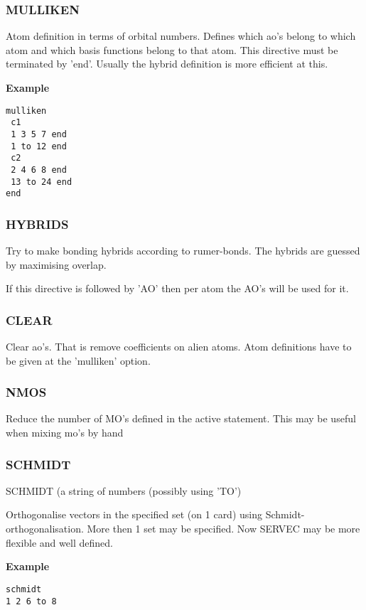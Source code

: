 \documentclass[11pt,fleqn]{article}
\begin{document}
\subsubsection{MULLIKEN}

Atom definition in terms of orbital numbers. Defines which ao's belong
to which atom and which basis functions belong to that atom. This directive must
be terminated by 'end'.  Usually the hybrid definition is more efficient at this.

{\bf Example}
\begin{verbatim}
mulliken
 c1
 1 3 5 7 end
 1 to 12 end
 c2
 2 4 6 8 end
 13 to 24 end
end
\end{verbatim}

\subsubsection{HYBRIDS}

Try to make bonding hybrids according to rumer-bonds. The hybrids are
guessed by maximising overlap.

If this directive is followed by 'AO' then per atom the AO's will be
used for it. 

\subsubsection{CLEAR}

Clear ao's. That is remove coefficients on alien atoms. Atom definitions
have to be given at the 'mulliken' option. 

\subsubsection{NMOS}

Reduce the number of MO's defined in the active statement. 
This may be useful when mixing mo's by hand

\subsubsection{SCHMIDT}

SCHMIDT (a string of numbers (possibly using 'TO')

Orthogonalise vectors in the specified set (on 1 card) using Schmidt-orthogonalisation. 
More then 1 set may be specified. Now SERVEC may be more flexible and well defined.

{\bf Example}
\begin{verbatim}
schmidt
1 2 6 to 8
\end{verbatim}
\end{document}
